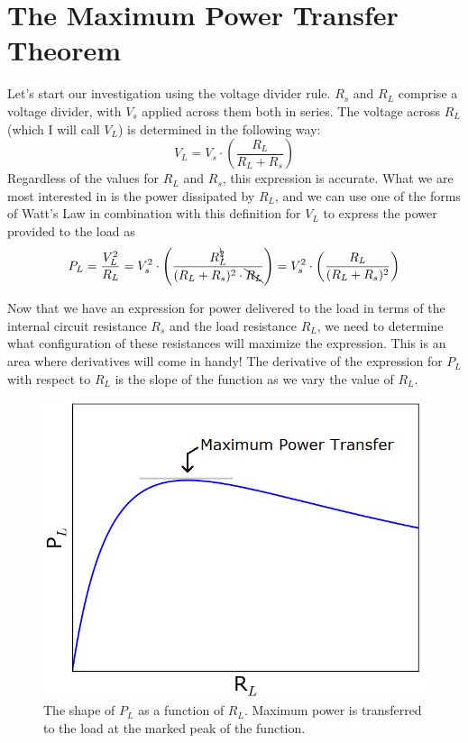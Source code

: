 \section{The Maximum Power Transfer Theorem}
Let's start our investigation using the voltage divider rule. $R_s$ and $R_L$ comprise a voltage divider, with $V_s$ applied across them both in series. The voltage across $R_L$ (which I will call $V_L$) is determined in the following way:
$$
V_L = V_s \cdot \left(\frac{R_L}{R_L + R_s}\right)
$$
Regardless of the values for $R_L$ and $R_s$, this expression is accurate. What we are most interested in is the power dissipated by $R_L$, and we can use one of the forms of Watt's Law in combination with this definition for $V_L$ to express the power provided to the load as 
$$
P_L = \frac{V_L^2}{R_L} = V_s^2 \cdot \left(\frac{R_L^{\bcancel{2}}}{(R_L + R_s)^2 \cdot \bcancel{R_L}}\right) = V_s^2 \cdot \left(\frac{R_L}{(R_L + R_s)^2}\right)
$$
\par
Now that we have an expression for power delivered to the load in terms of the internal circuit resistance $R_s$ and the load resistance $R_L$, we need to determine what configuration of these resistances will maximize the expression. This is an area where derivatives will come in handy! The derivative of the expression for $P_L$ with respect to $R_L$ is the slope of the function as we vary the value of $R_L$.
\begin{figure}[h!]
\centering
\includegraphics[width=13cm]{figures/PLvsRLrev1.png}
\caption{The shape of $P_L$ as a function of $R_L$. Maximum power is transferred to the load at the marked peak of the function.}
\label{PLvsRL}
\end{figure}
